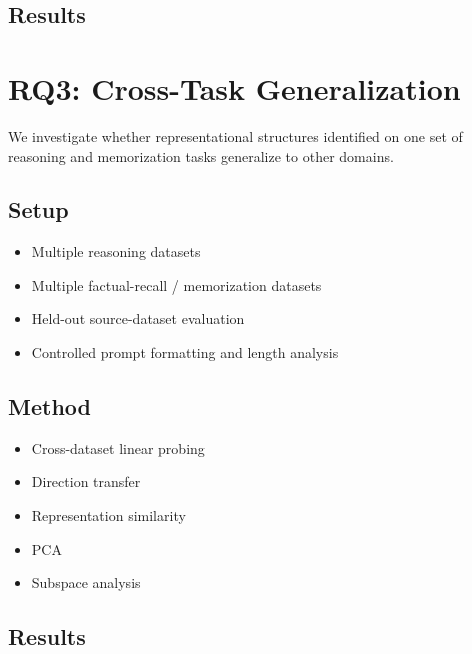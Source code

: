 \documentclass[11pt]{article}
\begin{document}
\subsection{Results}



\section{RQ3: Cross-Task Generalization}

We investigate whether representational structures identified on one
set of reasoning and memorization tasks generalize to other domains.

\subsection{Setup}

\begin{itemize}

    \item Multiple reasoning datasets
    \item Multiple factual-recall / memorization datasets
    \item Held-out source-dataset evaluation
    \item Controlled prompt formatting and length analysis

\end{itemize}

\subsection{Method}

\begin{itemize}

    \item Cross-dataset linear probing
    \item Direction transfer
    \item Representation similarity
    \item PCA
    \item Subspace analysis

\end{itemize}

\subsection{Results}
\end{document}
